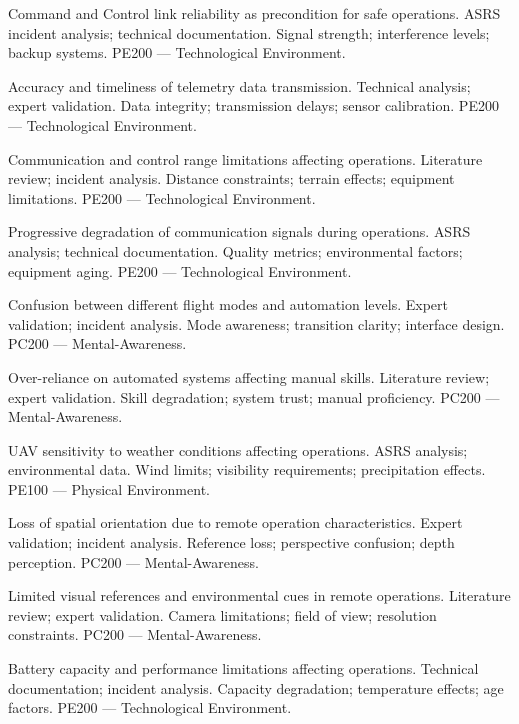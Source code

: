 {Command and Control link reliability as precondition for safe operations.}
{ASRS incident analysis; technical documentation.}
{Signal strength; interference levels; backup systems.}
{PE200 --- Technological Environment.}

{Accuracy and timeliness of telemetry data transmission.}
{Technical analysis; expert validation.}
{Data integrity; transmission delays; sensor calibration.}
{PE200 --- Technological Environment.}

{Communication and control range limitations affecting operations.}
{Literature review; incident analysis.}
{Distance constraints; terrain effects; equipment limitations.}
{PE200 --- Technological Environment.}

{Progressive degradation of communication signals during operations.}
{ASRS analysis; technical documentation.}
{Quality metrics; environmental factors; equipment aging.}
{PE200 --- Technological Environment.}

{Confusion between different flight modes and automation levels.}
{Expert validation; incident analysis.}
{Mode awareness; transition clarity; interface design.}
{PC200 --- Mental-Awareness.}

{Over-reliance on automated systems affecting manual skills.}
{Literature review; expert validation.}
{Skill degradation; system trust; manual proficiency.}
{PC200 --- Mental-Awareness.}

{UAV sensitivity to weather conditions affecting operations.}
{ASRS analysis; environmental data.}
{Wind limits; visibility requirements; precipitation effects.}
{PE100 --- Physical Environment.}

{Loss of spatial orientation due to remote operation characteristics.}
{Expert validation; incident analysis.}
{Reference loss; perspective confusion; depth perception.}
{PC200 --- Mental-Awareness.}

{Limited visual references and environmental cues in remote operations.}
{Literature review; expert validation.}
{Camera limitations; field of view; resolution constraints.}
{PC200 --- Mental-Awareness.}

{Battery capacity and performance limitations affecting operations.}
{Technical documentation; incident analysis.}
{Capacity degradation; temperature effects; age factors.}
{PE200 --- Technological Environment.}

